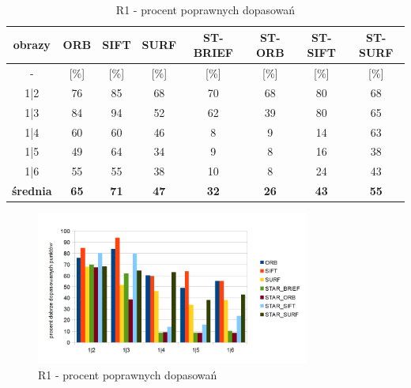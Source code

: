 \begin{table}[htbp]
  \centering
  \caption{R1 - procent poprawnych dopasowań}
    \begin{tabular}{|c|c|c|c|c|c|c|c|}\hline
    obrazy & \textbf{ORB} & \textbf{SIFT} & \textbf{SURF} & \textbf{ST-BRIEF} & \textbf{ST-ORB} & \textbf{ST-SIFT} & \textbf{ST-SURF} \\\hline
     - & [\%] & [\%] & [\%] & [\%] & [\%] & [\%] & [\%] \\\hline
    1|2 & 76 & 85 & 68 & 70 & 68 & 80 & 68 \\
    1|3 & 84 & 94 & 52 & 62 & 39 & 80 & 65 \\
    1|4 & 60 & 60 & 46 & 8 & 9 & 14 & 63 \\
    1|5 & 49 & 64 & 34 & 9 & 8 & 16 & 38 \\
    1|6 & 55 & 55 & 38 & 10 & 8 & 24 & 43 \\\hline
    \textbf{średnia} & \textbf{65} & \textbf{71} & \textbf{47} & \textbf{32} & \textbf{26} & \textbf{43} & \textbf{55} \\\hline
    
    \end{tabular}%
  \label{tab:r1_m2}%
\end{table}%


\begin{figure}[!htbp]
\centering
\includegraphics[width=0.8\textwidth]{pict/slowik/r1/m2.png}
\caption{R1 - procent poprawnych dopasowań}
\label{fig:r1_m2}
\end{figure}




\FloatBarrier
\newpage
